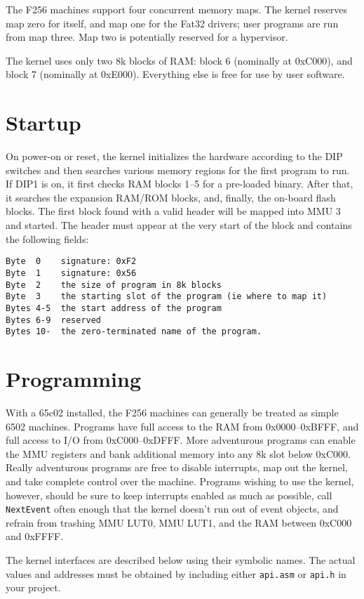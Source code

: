 The F256 machines support four concurrent memory maps.  The kernel reserves map zero for itself, and map one for the Fat32 drivers; user programs are run from map three.  Map two is potentially reserved for a hypervisor. 

The kernel uses only two 8k blocks of RAM: block 6 (nominally at 0xC000), and block 7 (nominally at 0xE000).  Everything else is free for use by user software.

\section*{Startup}
On power-on or reset, the kernel initializes the hardware according to the DIP switches and then searches various memory regions for the first program to run.  If DIP1 is on, it first checks RAM blocks 1--5 for a pre-loaded binary.  After that, it searches the expansion RAM/ROM blocks, and, finally, the on-board flash blocks. The first block found with a valid header will be mapped into MMU 3 and started.  The header must appear at the very start of the block and contains the following fields:

\begin{verbatim}
Byte  0    signature: 0xF2
Byte  1    signature: 0x56
Byte  2    the size of program in 8k blocks
Byte  3    the starting slot of the program (ie where to map it)
Bytes 4-5  the start address of the program
Bytes 6-9  reserved
Bytes 10-  the zero-terminated name of the program.
\end{verbatim}

\section*{Programming}
With a 65c02 installed, the F256 machines can generally be treated as simple 6502 machines.  Programs have full access to the RAM from 0x0000--0xBFFF, and full access to I/O from 0xC000--0xDFFF.  More adventurous programs can enable the MMU registers and bank additional memory into any 8k slot below 0xC000.  Really adventurous programs are free to disable interrupts, map out the kernel, and take complete control over the machine.  Programs wishing to use the kernel, however, should be sure to keep interrupts enabled as much as possible, call \verb+NextEvent+ often enough that the kernel doesn't run out of event objects, and refrain from trashing MMU LUT0, MMU LUT1, and the RAM between 0xC000 and 0xFFFF.

The kernel interfaces are described below using their symbolic names.  The actual values and addresses must be obtained by including either \verb+api.asm+ or \verb+api.h+ in your project.

